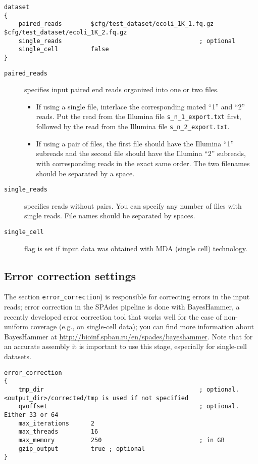 \documentclass{article}
\def\spades{SPAdes}
\def\bh{BayesHammer}
\begin{document}
\begin{lstlisting}													
dataset
{
    paired_reads        $cfg/test_dataset/ecoli_1K_1.fq.gz $cfg/test_dataset/ecoli_1K_2.fq.gz
    single_reads                                      ; optional
    single_cell         false
}
\end{lstlisting}

\begin{description}
\item[{\tt paired\_reads}] specifies input paired end reads organized into one or two files.
\begin{itemize}
\item If using a single file, interlace the corresponding mated ``1'' and ``2'' reads. Put the read from the Illumina file {\tt s\_n\_1\_export.txt} first, followed by the read from the Illumina file {\tt s\_n\_2\_export.txt}.
\item If using a pair of files, the first file should have the Illumina ``1'' subreads and the second file should have the Illumina ``2'' subreads, with corresponding reads in the exact same order.  The two filenames should be separated by a space.
\end{itemize}
\item[{\tt single\_reads}] specifies reads without pairs. You can specify any number of
files with single reads. File names should be separated by spaces.
\item[{\tt single\_cell}] flag is set if input data was obtained with MDA (single cell) technology.
\end{description}

\subsection{Error correction settings}
The section {\tt error\_correction}) is responsible for correcting errors in the input reads;
error correction in the {\spades} pipeline is done with {\bh}, a recently developed error correction tool that works well for the case of non-uniform coverage
(e.g., on single-cell data); you can find more information about {\bh} at \url{http://bioinf.spbau.ru/en/spades/bayeshammer}.
Note that for an accurate assembly it is important to use this stage, especially for single-cell datasets.

\begin{lstlisting}
error_correction
{
    tmp_dir                                           ; optional. <output_dir>/corrected/tmp is used if not specified
    qvoffset                                          ; optional. Either 33 or 64
    max_iterations      2
    max_threads         16
    max_memory          250                           ; in GB
    gzip_output         true ; optional
}
\end{lstlisting}
\end{document}
